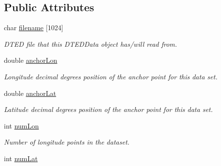 \subsection*{Public Attributes}
\begin{DoxyCompactItemize}
\item 
\hypertarget{class_d_t_e_d_object_ae9e6db315cc1fe401ca8f8bef6055bb8}{
char \hyperlink{class_d_t_e_d_object_ae9e6db315cc1fe401ca8f8bef6055bb8}{filename} \mbox{[}1024\mbox{]}}
\label{class_d_t_e_d_object_ae9e6db315cc1fe401ca8f8bef6055bb8}

\begin{DoxyCompactList}\small\item\em DTED file that this DTEDData object has/will read from. \end{DoxyCompactList}\item 
\hypertarget{class_d_t_e_d_object_a5707244eed1e3d52bfa6046861d1690b}{
double \hyperlink{class_d_t_e_d_object_a5707244eed1e3d52bfa6046861d1690b}{anchorLon}}
\label{class_d_t_e_d_object_a5707244eed1e3d52bfa6046861d1690b}

\begin{DoxyCompactList}\small\item\em Longitude decimal degrees position of the anchor point for this data set. \end{DoxyCompactList}\item 
\hypertarget{class_d_t_e_d_object_a7889492090fe5c8b54ff6e4c56574168}{
double \hyperlink{class_d_t_e_d_object_a7889492090fe5c8b54ff6e4c56574168}{anchorLat}}
\label{class_d_t_e_d_object_a7889492090fe5c8b54ff6e4c56574168}

\begin{DoxyCompactList}\small\item\em Latitude decimal degrees position of the anchor point for this data set. \end{DoxyCompactList}\item 
\hypertarget{class_d_t_e_d_object_a0e60a284185094cbd3ba5423a5200631}{
int \hyperlink{class_d_t_e_d_object_a0e60a284185094cbd3ba5423a5200631}{numLon}}
\label{class_d_t_e_d_object_a0e60a284185094cbd3ba5423a5200631}

\begin{DoxyCompactList}\small\item\em Number of longitude points in the dataset. \end{DoxyCompactList}\item 
\hypertarget{class_d_t_e_d_object_a0131ef554035b8bb2f4c792f62aab615}{
int \hyperlink{class_d_t_e_d_object_a0131ef554035b8bb2f4c792f62aab615}{numLat}}
\label{class_d_t_e_d_object_a0131ef554035b8bb2f4c792f62aab615}


\end{DoxyCompactItemize}
